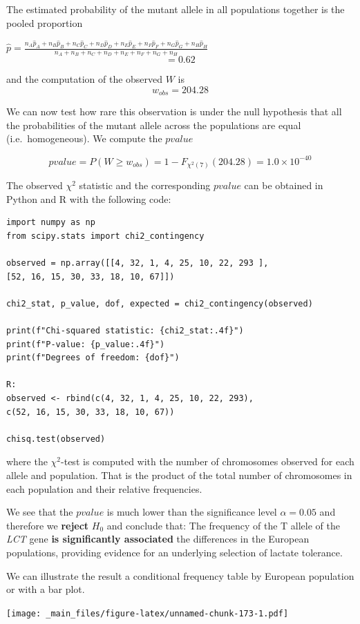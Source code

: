 \documentclass[
]{book}
\begin{document}
The estimated probability of the mutant allele in all populations together is the pooled proportion

\(\hat{p}=\frac{n_A\hat{p}_A+n_B\hat{p}_B+n_C\hat{p}_C+n_D\hat{p}_D+n_E\hat{p}_E+n_F\hat{p}_F+n_G\hat{p}_G+n_H\hat{p}_H}{n_A+n_B+n_C+n_D+n_E+n_F+n_G+n_H}\) \[=0.62\]

and the computation of the observed \(W\) is
\[w_{obs}=204.28\]

We can now test how rare this observation is under the null hypothesis that all the probabilities of the mutant allele across the populations are equal (i.e.~homogeneous). We compute the \(pvalue\)

\[pvalue=P(W \geq w_{obs}) =1-F_{\chi^2(7)}(204.28)= 1.0\times 10^{-40}\]

The observed \(\chi^2\) statistic and the corresponding \(pvalue\) can be obtained in Python and R with the following code:

\begin{verbatim}
import numpy as np
from scipy.stats import chi2_contingency

observed = np.array([[4, 32, 1, 4, 25, 10, 22, 293 ],
[52, 16, 15, 30, 33, 18, 10, 67]])

chi2_stat, p_value, dof, expected = chi2_contingency(observed)

print(f"Chi-squared statistic: {chi2_stat:.4f}")
print(f"P-value: {p_value:.4f}")
print(f"Degrees of freedom: {dof}")

R: 
observed <- rbind(c(4, 32, 1, 4, 25, 10, 22, 293),
c(52, 16, 15, 30, 33, 18, 10, 67))

chisq.test(observed)
\end{verbatim}

where the \(\chi^2\)-test is computed with the number of chromosomes observed for each allele and population. That is the product of the total number of chromosomes in each population and their relative frequencies.

We see that the \(pvalue\) is much lower than the significance level \(\alpha=0.05\) and therefore we \textbf{reject} \(H_0\) and conclude that: The frequency of the T allele of the \emph{LCT} gene \textbf{is significantly associated} the differences in the European populations, providing evidence for an underlying selection of lactate tolerance.

We can illustrate the result a conditional frequency table by European population or with a bar plot.

\texttt{[image: \_main\_files/figure-latex/unnamed-chunk-173-1.pdf]}
\end{document}
